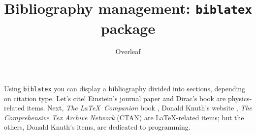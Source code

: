 \documentclass{article}
\title{Bibliography management: \texttt{biblatex} package}
\author{Overleaf}
\date{ }
\begin{document}
\maketitle

Using \texttt{biblatex} you can display a bibliography divided 
into sections, depending on citation type. Let's cite! Einstein's 
journal paper \cite{texbook} and Dirac's book \cite{texbook} are 
physics-related items. Next, \textit{The \LaTeX\ Companion} book
 \cite{texbook}, Donald Knuth's website \cite{texbook},
\textit{The Comprehensive Tex Archive Network} (CTAN) 
\cite{texbook} are \LaTeX-related items; but the others, Donald Knuth's items, 
\cite{texbook} are dedicated to programming. 

\medskip

\end{document}
